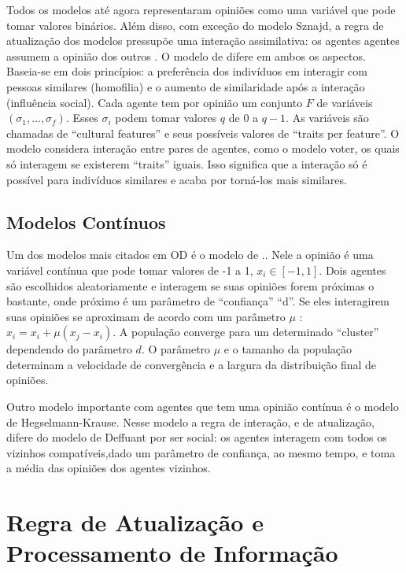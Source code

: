   
  Todos os modelos até agora representaram opiniões como uma variável que pode
  tomar valores binários. Além disso, com exceção do modelo Sznajd, a regra de
  atualização dos modelos pressupõe uma interação assimilativa: os agentes
  agentes assumem a opinião dos outros \cite{flache2017}. O modelo de
  \cite{axelrod1997dissemination} difere em ambos os aspectos. Baseia-se em dois
  princípios: a preferência dos indivíduos em interagir com pessoas similares
  (homofilia) e o aumento de similaridade após a interação (influência social).
  Cada agente tem por opinião um conjunto $F$ de variáveis $(\sigma_1 , \ldots, \sigma_f)$.
  Esses $\sigma_i$ podem tomar valores $q$ de 0 a $q-1$. As variáveis são chamadas de
  ``cultural features'' e seus possíveis valores de ``traits per feature''. O
  modelo considera interação entre pares de agentes, como o modelo voter, os
  quais só interagem se existerem ``traits'' iguais. Isso significa que a
  interação só é possível para indivíduos similares e acaba por torná-los mais
  similares.


\subsection{Modelos Contínuos}



\quad \quad Um dos modelos mais citados em OD é o modelo de
..
Nele a opinião é uma variável contínua que pode tomar valores de -1 a 1, $x_i \in
[-1,1]$. Dois agentes são escolhidos aleatoriamente e interagem se suas opiniões
forem próximas o bastante, onde próximo é um parâmetro de ``confiança'' ``d''.
Se eles interagirem suas opiniões se aproximam de acordo com um parâmetro $\mu$ :
$x_i = x_i + \mu(x_j - x_i)$. A população converge para um determinado ``cluster''
dependendo do parâmetro $d$. O parâmetro $\mu$ e o tamanho da população determinam
a velocidade de convergência e a largura da distribuição final de opiniões.

Outro modelo importante com agentes que tem uma opinião contínua é o modelo de
Hegselmann-Krause. Nesse modelo a regra de interação, e de atualização, difere
do modelo de Deffuant por ser social: os agentes interagem com todos os vizinhos
compatíveis,dado um parâmetro de confiança, ao mesmo tempo, e toma a média das
opiniões dos agentes vizinhos.


\section{Regra de Atualização e Processamento de Informação}


